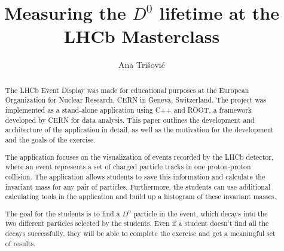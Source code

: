 \documentclass[3p,times,twocolumn]{elsarticle}
\begin{document}
\begin{frontmatter}




\title{Measuring the $D^0$ lifetime at the LHCb Masterclass}


\author{Ana Tri\v{s}ovi\'{c}}

\address{European Organization for Nuclear Research (CERN), Geneva, Switzerland}

\begin{abstract}
The LHCb Event Display was made for educational purposes at the European Organization for Nuclear Research, CERN in Geneva, Switzerland. The project was implemented as a stand-alone application using C++ and ROOT, a framework developed by CERN for data analysis. This paper outlines the development and architecture of the application in detail, as well as the motivation for the development and the goals of the exercise.

The application focuses on the visualization of events recorded by the LHCb detector, where an event represents a set of charged particle tracks in one proton-proton collision. The application allows students to save this information and calculate the invariant mass for any pair of particles. Furthermore, the students can use additional calculating tools in the application and build up a histogram of these invariant masses.

The goal for the students is to find a $D^0$ particle in the event, which decays into the two different particles selected by the students. Even if a student doesn't find all the decays successfully, they will be able to complete the exercise and get a meaningful set of results. 


\end{abstract}
\end{frontmatter}
\end{document}
